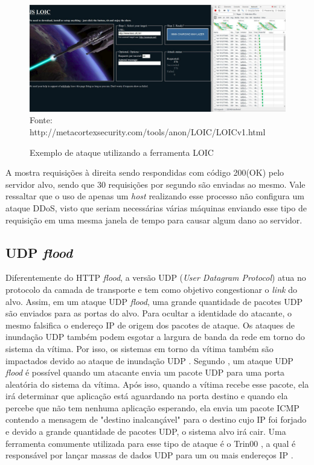  \begin{figure}[ht]
 	\centering
 	\caption{Exemplo de ataque utilizando a ferramenta LOIC }
 	\includegraphics[width=1\textwidth]{figs/loic.pdf}\\
 	{Fonte: http://metacortexsecurity.com/tools/anon/LOIC/LOICv1.html}
 	\label{fig:loic}
 \end{figure} 
 
 A  mostra requisições à direita sendo respondidas com código 200(OK) pelo servidor alvo, sendo que 30 requisições por segundo são enviadas ao mesmo. Vale ressaltar que o uso de apenas um \textit{host} realizando  esse processo não configura um ataque DDoS, visto que seriam necessárias várias máquinas enviando esse tipo de requisição em uma mesma janela de tempo para causar algum dano ao servidor.
 
 \subsection{UDP \textit{flood}}
 
 Diferentemente do HTTP \textit{flood}, a versão UDP (\textit{User Datagram Protocol}) atua no protocolo da camada de transporte e tem como objetivo congestionar o \textit{link} do alvo. Assim, em um ataque UDP \textit{flood}, uma grande quantidade de pacotes UDP são enviados para as portas do alvo. Para ocultar a identidade do atacante, o mesmo falsifica o endereço IP de origem dos pacotes de ataque. Os ataques de inundação UDP também podem esgotar a largura de banda da rede em torno do sistema da vítima. Por isso, os sistemas em torno da vítima também são impactados devido ao ataque de inundação UDP \cite{xiaoming2010denial}. Segundo , um ataque UDP \textit{flood} é possível quando um atacante envia um pacote UDP para uma porta aleatória do sistema da vítima. Após isso, quando a vítima recebe esse pacote, ela irá determinar que aplicação está aguardando na porta destino e quando ela percebe que não tem nenhuma aplicação esperando, ela envia um pacote ICMP contendo a mensagem de "destino inalcançável" para o destino cujo IP foi forjado e devido a grande quantidade de pacotes UDP, o sistema alvo irá cair. Uma ferramenta comumente utilizada para esse tipo de ataque é o Trin00 \cite{criscuolo2000distributed}, a qual é responsável por lançar massas de dados UDP para um ou mais endereços IP \cite{dittrich2002projectos}.
 
